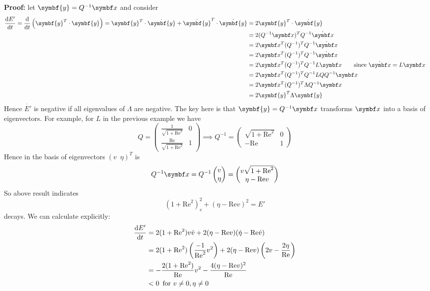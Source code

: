 \documentclass{jknotes}
\newcommand{\ReN}{\text{Re}}
\renewcommand{\y}{\symbf{y}}
\begin{document}
\textbf{Proof:} let $\y = Q^{-1} \x$ and consider 
\begin{align}
	\frac{\diffd E'}{\diffd t} = \frac{\diffd}{\diffd t} \left( \y^T \cdot
	\y\right) = \y^T \cdot \dot{\y} + \dot{\y}^T \cdot \dot{\y} &= 2 \y^T
	\cdot \dot{\y} \\
			  &= 2 (Q^{-1}\x)^TQ^{-1}\dot{\x} \\
			  &= 2\x^T (Q^{-1})^T Q^{-1}\dot{\x} \\
			  &= 2 \x^T (Q^{-1})^T Q^{-1} \dot{\x} \\
			  &= 2 \x^T (Q^{-1})^T Q^{-1} L \x \hspace{2em} \text{since} \,\,
			  \dot{\x} = L \x \\
			  &= 2 \x^T (Q^{-1})^T Q^{-1} L Q Q^{-1} \x \\
			  &= 2 \x^T (Q^{-1})^T \Lambda Q^{-1} \x \\
			  &= 2 \y^T \Lambda \y 
\end{align}
Hence $\dot{E'}$ is negative if all eigenvalues of $\Lambda$ are
negative. The key here is that $\y = Q^{-1} \x$ transforms $\x$ into a basis
of eigenvectors.  For example, for $L$ in the previous example we have
\begin{equation}
	Q = \begin{pmatrix} \frac{1}{\sqrt{1+\ReN^2}} & 0 \\
	\frac{\ReN}{\sqrt{1+\ReN^2}} & 1 \end{pmatrix} \implies Q^{-1} =
		\begin{pmatrix} \sqrt{1+\ReN^2} & 0 \\ -\ReN & 1 \end{pmatrix}
\end{equation}
Hence in the basis of eigenvectors $(v \,\,\, \eta)^T$ is
\begin{equation}
	Q^{-1}\x = Q^{-1} \begin{pmatrix} v \\ \eta \end{pmatrix} =
	\begin{pmatrix} v \sqrt{1+\ReN^2} \\ \eta - \ReN v \end{pmatrix}
\end{equation}
So above result indicates 
\begin{equation}
	(1+\ReN^2)_v^2 + (\eta- \ReN v)^2 = E'
\end{equation}
decays. We can calculate explicitly:
\begin{align}
	\frac{\diffd E'}{\diffd t} 
	&= 2(1+\ReN^2)v\dot{v} + 2(\eta-\ReN v)(\dot{\eta} - \ReN \dot{v}) \\
	&= 2 (1+\ReN^2)\left(\frac{-1}{\ReN^2} v^2\right) + 2(\eta - \ReN
	v)\left(2v - \frac{2\eta}{\ReN}\right) \\
	&= -\frac{2(1+\ReN^2)}{\ReN} v^2 - \frac{4(\eta - \ReN v)^2}{\ReN}\\
	&< 0 \,\,\, \text{for} \,\, v \ne 0, \eta \ne 0
\end{align}
\end{document}
